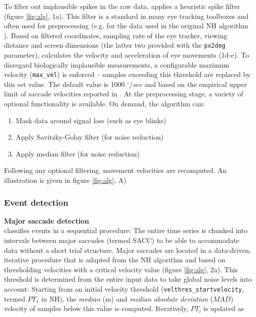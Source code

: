 To filter out implausible spikes in the raw data, \remodnav applies a heuristic spike filter \citep{stampe1993}
(figure \ref{fig:alg}, 1a). This filter is a standard in many eye tracking toolboxes and often used for preprocessing
(e.g. for the data used in the original NH algorithm \citep{Friedman2018}). Based on filtered coordinates, sampling
rate of the eye tracker, viewing distance and screen dimensions (the latter two provided with the \texttt{px2deg}
parameter), \remodnav calculates the velocity and acceleration of eye movements (1d-e). To disregard biologically
implausible measurements, a configurable maximum velocity (\texttt{max\_vel}) is enforced -- samples exceeding this
threshold are replaced by this set value. The default value is 1000 $^\circ/sec$ and based on the empirical upper
limit of saccade velocities reported in \cite{holmqvist2011eye}.
At the preprocessing stage, a variety of optional functionality is available. On demand, the algorithm can:
\begin{enumerate}
    \item Mask data around signal loss (such as eye blinks)
    \item Apply Savitzky-Golay filter (for noise reduction)
    \item Apply median filter (for noise reduction)
\end{enumerate}
Following any optional filtering, movement velocities are recomputed. An illustration is given in figure
\ref{fig:alg}, A)


\subsubsection*{Event detection}

\textbf{Major saccade detection}\\
\remodnav classifies events in a sequential procedure: The entire time series is chunked into intervals between
major saccades (termed SACC) to be able to accommodate
data without a short trial structure. Major saccades are located in a data-driven,
iterative procedure that is adapted from the NH algorithm and based on thresholding velocities with a critical
velocity value (figure \ref{fig:alg}, 2a). This threshold is determined from the entire input data to take global
noise levels into account: Starting from an initial velocity threshold
(\texttt{velthres\_\linebreak[0]startvelocity}, termed
$PT_1$ in NH), the \textit{median} (m) and \textit{median absolute deviation} ($MAD$) velocity of samples below this
value is computed. Iteratively, $PT_i$ is updated as

